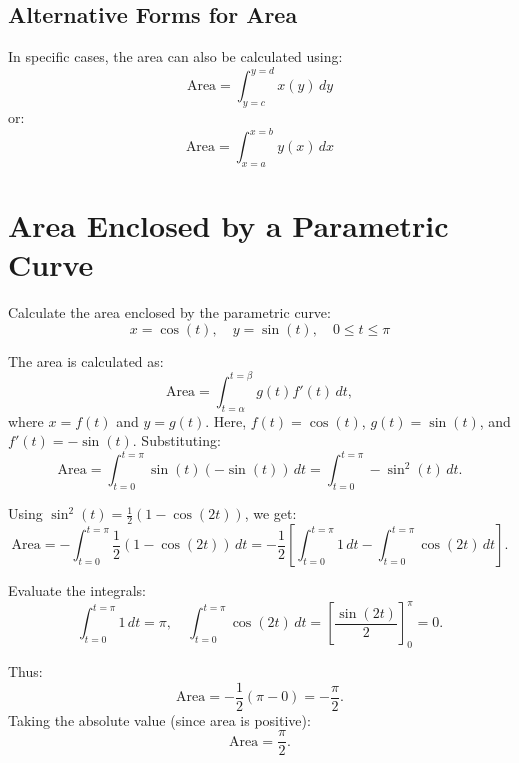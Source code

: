 \documentclass{article}
\begin{document}
\subsection*{Alternative Forms for Area}
\begin{notebox}
In specific cases, the area can also be calculated using:
\[
    \text{Area} = \int_{y=c}^{y=d} x(y) \, dy
\]
or:
\[
    \text{Area} = \int_{x=a}^{x=b} y(x) \, dx
\]
\end{notebox}

\section*{Area Enclosed by a Parametric Curve}
\begin{examplebox}
Calculate the area enclosed by the parametric curve:
\[
    x = \cos(t), \quad y = \sin(t), \quad 0 \leq t \leq \pi
\]

\begin{solutionbox}
The area is calculated as:
\[
    \text{Area} = \int_{t=\alpha}^{t=\beta} g(t) f'(t) \, dt,
\]
where \( x = f(t) \) and \( y = g(t) \). Here, \( f(t) = \cos(t) \), \( g(t) = \sin(t) \), and \( f'(t) = -\sin(t) \). Substituting:
\[
    \text{Area} = \int_{t=0}^{t=\pi} \sin(t)(-\sin(t)) \, dt = \int_{t=0}^{t=\pi} -\sin^2(t) \, dt.
\]

Using \( \sin^2(t) = \frac{1}{2}(1 - \cos(2t)) \), we get:
\[
    \text{Area} = -\int_{t=0}^{t=\pi} \frac{1}{2}(1 - \cos(2t)) \, dt = -\frac{1}{2} \left[ \int_{t=0}^{t=\pi} 1 \, dt - \int_{t=0}^{t=\pi} \cos(2t) \, dt \right].
\]

Evaluate the integrals:
\[
    \int_{t=0}^{t=\pi} 1 \, dt = \pi, \quad \int_{t=0}^{t=\pi} \cos(2t) \, dt = \left[ \frac{\sin(2t)}{2} \right]_0^\pi = 0.
\]

Thus:
\[
    \text{Area} = -\frac{1}{2}(\pi - 0) = -\frac{\pi}{2}.
\]
Taking the absolute value (since area is positive):
\[
    \text{Area} = \frac{\pi}{2}.
\]
\end{solutionbox}
\end{examplebox}
\end{document}
